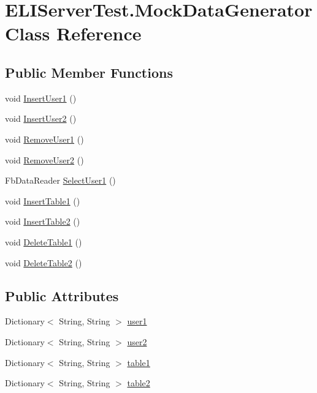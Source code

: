 \hypertarget{class_e_l_i_server_test_1_1_mock_data_generator}{}\section{E\+L\+I\+Server\+Test.\+Mock\+Data\+Generator Class Reference}
\label{class_e_l_i_server_test_1_1_mock_data_generator}
\subsection*{Public Member Functions}
\begin{DoxyCompactItemize}
\item 
void \hyperlink{class_e_l_i_server_test_1_1_mock_data_generator_a02a052a225fa2e96c02dbf999a00580b}{Insert\+User1} ()
\item 
void \hyperlink{class_e_l_i_server_test_1_1_mock_data_generator_a4a248e66cefc33a4a9c0c0699b9d6ddb}{Insert\+User2} ()
\item 
void \hyperlink{class_e_l_i_server_test_1_1_mock_data_generator_ab9244658cbb6ef54db1567bbfc9743a8}{Remove\+User1} ()
\item 
void \hyperlink{class_e_l_i_server_test_1_1_mock_data_generator_ac912f5bae53b8610f2ab348577f02ed1}{Remove\+User2} ()
\item 
Fb\+Data\+Reader \hyperlink{class_e_l_i_server_test_1_1_mock_data_generator_af325f2b175d0ee7aa0a18e1702bb4ca8}{Select\+User1} ()
\item 
void \hyperlink{class_e_l_i_server_test_1_1_mock_data_generator_a6afdd91a5d161b66dc2e8bf67b1b790d}{Insert\+Table1} ()
\item 
void \hyperlink{class_e_l_i_server_test_1_1_mock_data_generator_a015c5c3b36f78bc8e710d78431846620}{Insert\+Table2} ()
\item 
void \hyperlink{class_e_l_i_server_test_1_1_mock_data_generator_a0eb307d95db2b3a775358544020135f7}{Delete\+Table1} ()
\item 
void \hyperlink{class_e_l_i_server_test_1_1_mock_data_generator_a9b32ff001876e33d57f146f95ead361c}{Delete\+Table2} ()
\end{DoxyCompactItemize}
\subsection*{Public Attributes}
\begin{DoxyCompactItemize}
\item 
Dictionary$<$ String, String $>$ \hyperlink{class_e_l_i_server_test_1_1_mock_data_generator_a37b1c657a54b2b653816db24cba58519}{user1}
\item 
Dictionary$<$ String, String $>$ \hyperlink{class_e_l_i_server_test_1_1_mock_data_generator_a493d22ff32a1a83f130c1e2775dc14ec}{user2}
\item 
Dictionary$<$ String, String $>$ \hyperlink{class_e_l_i_server_test_1_1_mock_data_generator_ac364ed13426dc2df4c21e8744a2a2197}{table1}
\item 
Dictionary$<$ String, String $>$ \hyperlink{class_e_l_i_server_test_1_1_mock_data_generator_ac2747ac91df6a2bc224cdd1971450656}{table2}
\end{DoxyCompactItemize}


